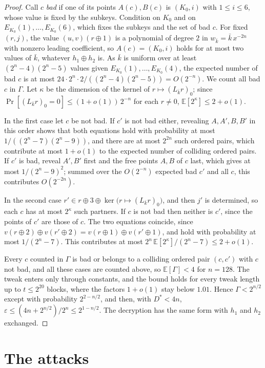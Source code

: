 \documentclass[11pt]{article}
\theoremstyle{definition}
\theoremstyle{remark}
\newcommand{\eps}{\varepsilon}
\begin{document}
\begin{proof}
Call $c$ \emph{bad} if one of its points $A(c),B(c)$ is $(K_0,i)$ with $1\le i\le6$, whose value is fixed by the subkeys. Condition on $K_0$ and on $E_{K_0}(1),\dots,E_{K_0}(6)$, which fixes the subkeys and the set of bad $c$. For fixed $(r,j)$, the value $(u,v)(r\oplus1)$ is a polynomial of degree $2$ in $w_{\bar k}=\bar k\,x^{-2n}$ with nonzero leading coefficient, so $A(c)=(K_0,i)$ holds for at most two values of $\bar k$, whatever $h_1\oplus h_2$ is. As $\bar k$ is uniform over at least $(2^n-4)(2^n-5)$ values given $E_{K_0}(1),\dots,E_{K_0}(4)$, the expected number of bad $c$ is at most $24\cdot2^n\cdot2/((2^n-4)(2^n-5))=O(2^{-n})$. We count all bad $c$ in $\Gamma$. Let $\kappa$ be the dimension of the kernel of $r\mapsto(L_{\bar k}r)_0$; since $\Pr[(L_{\bar k}r)_0=0]\le(1+o(1))\,2^{-n}$ for each $r\ne0$, $\mathbb{E}[2^\kappa]\le2+o(1)$.

In the first case let $c$ be not bad. If $c'$ is not bad either, revealing $A,A',B,B'$ in this order shows that both equations hold with probability at most $1/((2^n-7)(2^n-9))$, and there are at most $2^{2n}$ such ordered pairs, which contribute at most $1+o(1)$ to the expected number of colliding ordered pairs. If $c'$ is bad, reveal $A',B'$ first and the free points $A,B$ of $c$ last, which gives at most $1/(2^n-9)^2$; summed over the $O(2^{-n})$ expected bad $c'$ and all $c$, this contributes $O(2^{-2n})$.

In the second case $r'\in r\oplus3\oplus\ker\bigl(r\mapsto(L_{\bar k}r)_0\bigr)$, and then $j'$ is determined, so each $c$ has at most $2^\kappa$ such partners. If $c$ is not bad then neither is $c'$, since the points of $c'$ are those of $c$. The two equations coincide, since $v(r\oplus2)\oplus v(r'\oplus2)=v(r\oplus1)\oplus v(r'\oplus1)$, and hold with probability at most $1/(2^n-7)$. This contributes at most $2^n\,\mathbb{E}[2^\kappa]/(2^n-7)\le2+o(1)$.

Every $c$ counted in $\Gamma$ is bad or belongs to a colliding ordered pair $(c,c')$ with $c$ not bad, and all these cases are counted above, so $\mathbb{E}[\Gamma]<4$ for $n=128$. The tweak enters only through constants, and the bound holds for every tweak length up to $t\le2^{20}$ blocks, where the factors $1+o(1)$ stay below $1.01$. Hence $\Gamma<2^{n/2}$ except with probability $2^{2-n/2}$, and then, with $D^\ast<4n$, $\eps\le(4n+2^{n/2})/2^n\le2^{1-n/2}$. The decryption has the same form with $h_1$ and $h_2$ exchanged.
\end{proof}

\section{The attacks}\label{sec:attacks}
\end{document}
